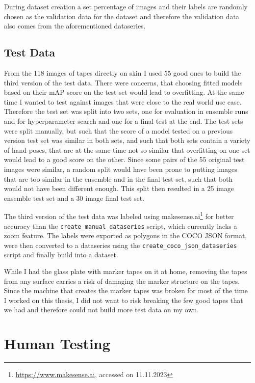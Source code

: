 \documentclass[10pt]{book}
\begin{document}
During dataset creation a set percentage of images and their labels are randomly chosen as the validation data for the dataset and therefore the validation data also comes from the aforementioned dataseries.

\subsection{Test Data}

From the 118 images of tapes directly on skin I used 55 good ones to build the third version of the test data. There were concerns, that choosing fitted models based on their \ac{mAP} score on the test set would lead to overfitting. At the same time I wanted to test against images that were close to the real world use case. Therefore the test set was split into two sets, one for evaluation in ensemble runs and for hyperparameter search and one for a final test at the end. The test sets were split manually, but such that the score of a model tested on a previous version test set was similar in both sets, and such that both sets contain a variety of hand poses, that are at the same time not so similar that overfitting on one set would lead to a good score on the other. Since some pairs of the 55 original test images were similar, a random split would have been prone to putting images that are too similar in the ensemble and in the final test set, such that both would not have been different enough. This split then resulted in a 25 image ensemble test set and a 30 image final test set.

The third version of the test data was labeled using makesense.ai\footnote{\url{https://www.makesense.ai}, accessed on 11.11.2023} for better accuracy than the \texttt{create\_manual\_dataseries} script, which currently lacks a zoom feature. The labels were exported as polygons in the \ac{COCO} \ac{JSON} format, were then converted to a dataseries using the \texttt{create\_coco\_json\_dataseries} script and finally build into a dataset.

While I had the glass plate with marker tapes on it at home, removing the tapes from any surface carries a risk of damaging the marker structure on the tapes. Since the machine that creates the marker tapes was broken for most of the time I worked on this thesis, I did not want to risk breaking the few good tapes that we had and therefore could not build more test data on my own.

\section{Human Testing}
\end{document}
